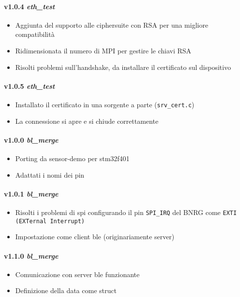 \paragraph{v1.0.4 \textit{eth\_test}}
	\begin{itemize}
		\item Aggiunta del supporto alle ciphersuite con RSA per una migliore compatibilit\`{a}
		\item Ridimensionata il numero di MPI per gestire le chiavi RSA
		\item Risolti problemi sull'handshake, da installare il certificato sul dispositivo
	\end{itemize}
\paragraph{v1.0.5 \textit{eth\_test}}
	\begin{itemize}
		\item Installato il certificato in una sorgente a parte (\texttt{srv\_cert.c})
		\item La connessione si apre e si chiude correttamente
	\end{itemize}
\paragraph{v1.0.0 \textit{bl\_merge}}
	\begin{itemize}
		\item Porting da sensor-demo per stm32f401
		\item Adattati i nomi dei pin
	\end{itemize}
\paragraph{v1.0.1 \textit{bl\_merge}}
	\begin{itemize}
    \item Risolti i problemi di spi configurando il pin \texttt{SPI\_IRQ} del BNRG come \texttt{EXTI (EXTernal Interrupt)}
		\item Impostazione come client ble (originariamente server)
	\end{itemize}
\paragraph{v1.1.0 \textit{bl\_merge}}
	\begin{itemize}
		\item Comunicazione con server ble funzionante
		\item Definizione della data come struct
	\end{itemize}
